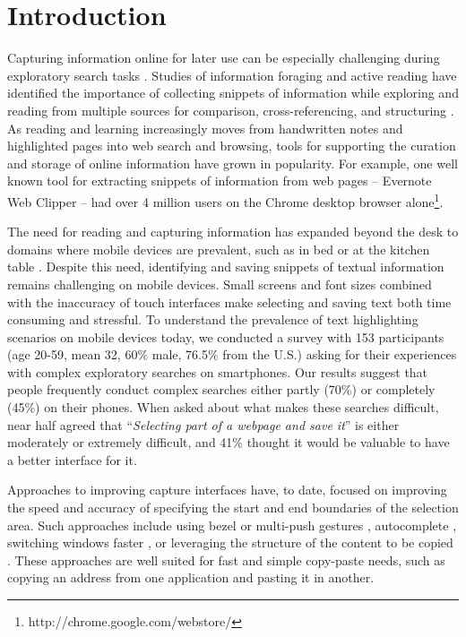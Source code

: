 \section{Introduction}

Capturing information online for later use can be especially challenging during exploratory search tasks \cite{Capra:2010:TLM:1753326.1753468}. Studies of information foraging \cite{pirolli1999information} and active reading \cite{morris2007reading} have identified the importance of collecting snippets of information while exploring and reading from multiple sources for comparison, cross-referencing, and structuring \cite{kirsh1995intelligent, adler1998diary, tashman2011active, kittur2013costs}. As reading and learning increasingly moves from handwritten notes and highlighted pages into web search and browsing, tools for supporting the curation and storage of online information have grown in popularity. For example, one well known tool for extracting snippets of information from web pages -- Evernote Web Clipper -- had over 4 million users on the Chrome desktop browser alone\footnote{http://chrome.google.com/webstore/}.

The need for reading and capturing information has expanded beyond the desk to domains where mobile devices are prevalent, such as in bed or at the kitchen table \cite{ adler1998diary,tashman2011active}. Despite this need, identifying and saving snippets of textual information remains challenging on mobile devices. Small screens and font sizes combined with the inaccuracy of touch interfaces make selecting and saving text both time consuming and stressful. To understand the prevalence of text highlighting scenarios on mobile devices today, we conducted a survey with 153 participants (age 20-59, mean 32, 60\% male, 76.5\% from the U.S.) asking for their experiences with complex exploratory searches \cite{marchionini2006exploratory} on smartphones. Our results suggest that people frequently conduct complex searches either partly (70\%) or completely (45\%) on their phones. When asked about what makes these searches difficult, near half agreed that ``\emph{Selecting part of a webpage and save it}'' is either moderately or extremely difficult, and 41\% thought it would be valuable to have a better interface for it.

Approaches to improving capture interfaces have, to date, focused on improving the speed and accuracy of specifying the start and end boundaries of the selection area. Such approaches include using bezel or multi-push gestures \cite{chen2014bezelcopy, roth2009bezel, han2015push}, autocomplete \cite{zhao2012autocompaste}, switching windows faster \cite{chapuis2007copy, faure2009power}, or leveraging the structure of the content to be copied \cite{bier2006entity, ives2009interactive, stylos2004citrine}. These approaches are well suited for fast and simple copy-paste needs, such as copying an address from one application and pasting it in another.



